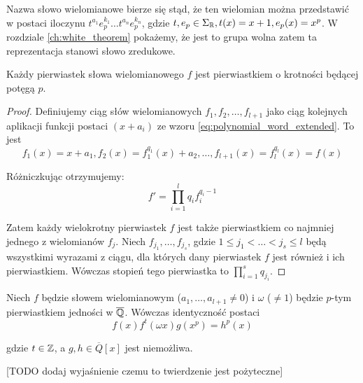 Nazwa słowo wielomianowe bierze się stąd, że ten wielomian można przedstawić w
postaci iloczynu $t^{a_1}e_p^{k_1} \ldots t^{a_n}e_p^{k_n}$, gdzie $t, e_p \in
\Sigma_{\mathbb{R}}, t(x) = x + 1, e_p(x) = x^p$. W rozdziale \ref{ch:white_theorem}
pokażemy, że jest to grupa wolna zatem ta reprezentacja stanowi słowo
zredukowe.

\begin{lemma}
  Każdy pierwiastek słowa wielomianowego $f$ jest pierwiastkiem o krotności
  będącej potęgą $p$.
  \label{lem:multiplicity_lemma}
\end{lemma}

\begin{proof}
Definiujemy ciąg słów wielomianowych $f_1, f_2, \ldots, f_{l+1}$ jako ciąg
kolejnych aplikacji funkcji postaci $(x+a_i)$ ze wzoru
\ref{eq:polynomial_word_extended}.
To jest
\[f_1(x) = x + a_1, f_2(x) = f_1^{q_1}(x) + a_2, \ldots, f_{l+1}(x) =
f_l^{q_l}(x) = f(x)\]

Różniczkując otrzymujemy:
\[f' = \prod_{i=1}^l q_i f_i^{q_i - 1}\]

Zatem każdy wielokrotny pierwiastek $f$ jest także pierwiastkiem co najmniej
jednego z wielomianów $f_j$. Niech $f_{j_1}, \ldots, f_{j_s}$, gdzie $1 \leq j_1
< \ldots < j_s \leq l$ będą wszystkimi wyrazami z ciągu, dla których dany
pierwiastek $f$ jest również i ich pierwiastkiem. Wówczas stopień tego
pierwiastka to $\prod_{i=1}^s q_{j_i}$.
\end{proof}

\begin{lemma}
  Niech $f$ będzie słowem wielomianowym ($a_1, \ldots, a_{l+1} \neq 0$) i
  $\omega$ ($\neq 1$) będzie $p$-tym pierwiastkiem jedności w $\overline{\mathbb{Q}}$.
  Wówczas identyczność postaci
  \begin{equation}
    f(x)f^t(\omega x)g\left(x^p\right) = h^p(x)
    \label{eq:polynomial_lemma}
  \end{equation}

  gdzie $t \in \mathbb{Z}$, a $g, h \in \overline{Q}[x]$ jest niemożliwa.
  \label{lem:main_polynomial_lemma}
\end{lemma}

[TODO dodaj wyjaśnienie czemu to twierdzenie jest pożyteczne]

